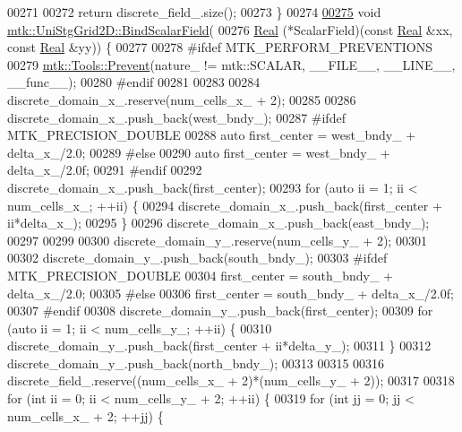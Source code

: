 \begin{DoxyCode}
00271 
00272   \textcolor{keywordflow}{return} discrete\_field\_.size();
00273 \}
00274 
\hypertarget{mtk__uni__stg__grid__2d_8cc_source_l00275}{}\hyperlink{classmtk_1_1UniStgGrid2D_a5f9910ffb94e0314b16c026c4b5762ee}{00275} \textcolor{keywordtype}{void} \hyperlink{classmtk_1_1UniStgGrid2D_a5f9910ffb94e0314b16c026c4b5762ee}{mtk::UniStgGrid2D::BindScalarField}(
00276     \hyperlink{group__c01-roots_gac080bbbf5cbb5502c9f00405f894857d}{Real} (*ScalarField)(\textcolor{keyword}{const} \hyperlink{group__c01-roots_gac080bbbf5cbb5502c9f00405f894857d}{Real} &xx, \textcolor{keyword}{const} \hyperlink{group__c01-roots_gac080bbbf5cbb5502c9f00405f894857d}{Real} &yy)) \{
00277 
00278 \textcolor{preprocessor}{  #ifdef MTK\_PERFORM\_PREVENTIONS}
00279   \hyperlink{classmtk_1_1Tools_a332324c6f25e66be9dff48c5987a3b9f}{mtk::Tools::Prevent}(nature\_ != mtk::SCALAR, \_\_FILE\_\_, \_\_LINE\_\_, \_\_func\_\_);
00280 \textcolor{preprocessor}{  #endif}
00281 
00283 
00284   discrete\_domain\_x\_.reserve(num\_cells\_x\_ + 2);
00285 
00286   discrete\_domain\_x\_.push\_back(west\_bndy\_);
00287 \textcolor{preprocessor}{  #ifdef MTK\_PRECISION\_DOUBLE}
00288   \textcolor{keyword}{auto} first\_center = west\_bndy\_ + delta\_x\_/2.0;
00289 \textcolor{preprocessor}{  #else}
00290   \textcolor{keyword}{auto} first\_center = west\_bndy\_ + delta\_x\_/2.0f;
00291 \textcolor{preprocessor}{  #endif}
00292   discrete\_domain\_x\_.push\_back(first\_center);
00293   \textcolor{keywordflow}{for} (\textcolor{keyword}{auto} ii = 1; ii < num\_cells\_x\_; ++ii) \{
00294     discrete\_domain\_x\_.push\_back(first\_center + ii*delta\_x\_);
00295   \}
00296   discrete\_domain\_x\_.push\_back(east\_bndy\_);
00297 
00299 
00300   discrete\_domain\_y\_.reserve(num\_cells\_y\_ + 2);
00301 
00302   discrete\_domain\_y\_.push\_back(south\_bndy\_);
00303 \textcolor{preprocessor}{  #ifdef MTK\_PRECISION\_DOUBLE}
00304   first\_center = south\_bndy\_ + delta\_x\_/2.0;
00305 \textcolor{preprocessor}{  #else}
00306   first\_center = south\_bndy\_ + delta\_x\_/2.0f;
00307 \textcolor{preprocessor}{  #endif}
00308   discrete\_domain\_y\_.push\_back(first\_center);
00309   \textcolor{keywordflow}{for} (\textcolor{keyword}{auto} ii = 1; ii < num\_cells\_y\_; ++ii) \{
00310     discrete\_domain\_y\_.push\_back(first\_center + ii*delta\_y\_);
00311   \}
00312   discrete\_domain\_y\_.push\_back(north\_bndy\_);
00313 
00315 
00316   discrete\_field\_.reserve((num\_cells\_x\_ + 2)*(num\_cells\_y\_ + 2));
00317 
00318   \textcolor{keywordflow}{for} (\textcolor{keywordtype}{int} ii = 0; ii < num\_cells\_y\_ + 2; ++ii) \{
00319     \textcolor{keywordflow}{for} (\textcolor{keywordtype}{int} jj = 0; jj < num\_cells\_x\_ + 2; ++jj) \{

\end{DoxyCode}
